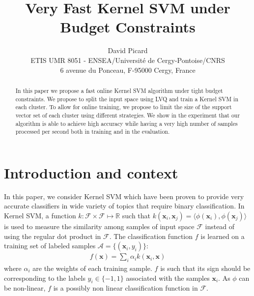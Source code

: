 \documentclass[10pt,final,a4paper]{article}
\newcommand{\x}{\mathbf{x}}
\newcommand{\Acal}{\mathcal{A}}
\newcommand{\Fcal}{\mathcal{F}}
\begin{document}
\title{Very Fast Kernel SVM under Budget Constraints}

\author{David Picard
%
%
\vspace{.3cm}\\
%
ETIS UMR 8051 - ENSEA/Université de Cergy-Pontoise/CNRS \\
6 avenue du Ponceau, F-95000 Cergy, France
}

\maketitle

\begin{abstract}
In this paper we propose a fast online Kernel SVM algorithm under tight budget constraints.
We propose to split the input space using LVQ and train a Kernel SVM in each cluster.
To allow for online training, we propose to limit the size of the support vector set of each cluster using different strategies.
We show in the experiment that our algorithm is able to achieve high accuracy while having a very high number of samples processed per second both in training and in the evaluation.
\end{abstract} 

\section{Introduction and context}

In this paper, we consider Kernel SVM which have been proven to provide very accurate classifiers in wide variety of topics that require binary classification.
In Kernel SVM, a function $k : \Fcal \times \Fcal \mapsto \mathbb{R} $ such that $k(\x_i, \x_j) = \langle \phi(\x_i) , \phi(\x_j) \rangle$ is used to measure the similarity among samples of input space $\Fcal$ instead of using the regular dot product in $\Fcal$.
The classification function $f$ is learned on a training set of labeled samples $\Acal = \{ (\x_i, y_i) \}$:
\begin{align}
	f(\x) = \sum_i \alpha_i k(\x_i, \x)
\end{align}
where $\alpha_i$ are the weights of each training sample.
$f$ is such that its sign should be corresponding to the labels $y_i  \in \{-1, 1\}$ associated with the samples $\x_i$.
As $\phi$ can be non-linear, $f$ is a possibly non linear classification function in $\Fcal$.
\end{document}
